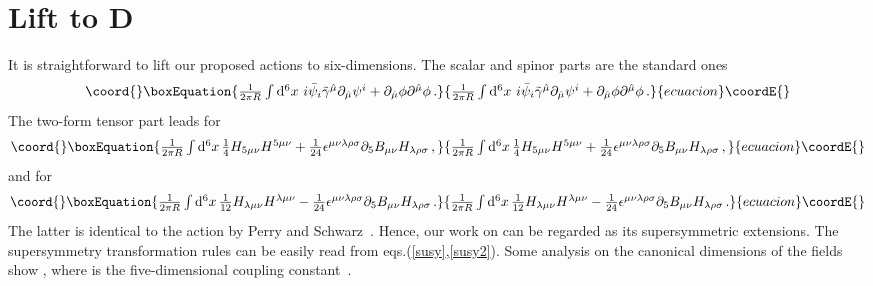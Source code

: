 \documentclass[a4paper,12pt]{article}
\def\L{{\cal L}}
\begin{document}
\section{Lift to \coordHE{}D\label{lift}}
It is straightforward to lift our proposed actions to six-dimensions. The scalar and spinor parts are the standard ones 
\begin{equation}\coord{}\boxEquation{
\textstyle{\frac{1}{2\pi R}}\int {\rm d}^{6}x\,\,i\bar{\psi}_{i}\tilde{\gamma}^{\hat{\mu}}\partial_{\hat{\mu}}
\psi^{i}+\partial_{\hat{\mu}}\phi\partial^{\hat{\mu}}\phi\,.
}{
\textstyle{\frac{1}{2\pi R}}\int {\rm d}^{6}x\,\,i\bar{\psi}_{i}\tilde{\gamma}^{\hat{\mu}}\partial_{\hat{\mu}}
\psi^{i}+\partial_{\hat{\mu}}\phi\partial^{\hat{\mu}}\phi\,.
}{ecuacion}\coordE{}\end{equation}
The two-form tensor part leads  for \myHighlight{$\L_{1}$}\coordHE{}
\begin{equation}\coord{}\boxEquation{
\textstyle{\frac{1}{2\pi R}}\int {\rm d}^{6}x\,\textstyle{\frac{1}{4}}H_{5\mu\nu}H^{5\mu\nu}+\textstyle{\frac{1}{24}}\epsilon^{\mu\nu\lambda\rho\sigma}\partial_{5}B_{\mu\nu}H_{\lambda\rho\sigma}\,,
\label{B2}
}{
\textstyle{\frac{1}{2\pi R}}\int {\rm d}^{6}x\,\textstyle{\frac{1}{4}}H_{5\mu\nu}H^{5\mu\nu}+\textstyle{\frac{1}{24}}\epsilon^{\mu\nu\lambda\rho\sigma}\partial_{5}B_{\mu\nu}H_{\lambda\rho\sigma}\,,
}{ecuacion}\coordE{}\end{equation}
and for \myHighlight{$\L_{2}$}\coordHE{}
\begin{equation}\coord{}\boxEquation{
\textstyle{\frac{1}{2\pi R}}\int {\rm d}^{6}x\,\textstyle{\frac{1}{12}}H_{\lambda\mu\nu}H^{\lambda\mu\nu}-\textstyle{\frac{1}{24}}\epsilon^{\mu\nu\lambda\rho\sigma}\partial_{5}B_{\mu\nu}H_{\lambda\rho\sigma}\,.
\label{pesc}
}{
\textstyle{\frac{1}{2\pi R}}\int {\rm d}^{6}x\,\textstyle{\frac{1}{12}}H_{\lambda\mu\nu}H^{\lambda\mu\nu}-\textstyle{\frac{1}{24}}\epsilon^{\mu\nu\lambda\rho\sigma}\partial_{5}B_{\mu\nu}H_{\lambda\rho\sigma}\,.
}{ecuacion}\coordE{}\end{equation}
The latter is identical to the action  by Perry and Schwarz~\cite{9611065}.  Hence, our work on \myHighlight{$\L_{2}$}\coordHE{} can be regarded as  
its  \coordHE{} supersymmetric extensions. The supersymmetry transformation rules  can be easily read from eqs.(\ref{susy},\ref{susy2}).  Some analysis on the canonical dimensions of the fields show \coordHE{}, where \coordHE{} is the five-dimensional coupling constant~\cite{seiberg16,0004195}.\newline 
\end{document}
